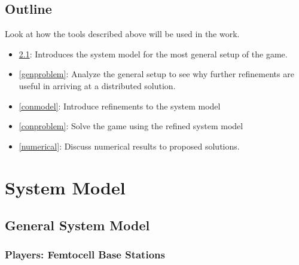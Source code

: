\documentclass[12pt,a4paper]{report}
\begin{document}
\section{Outline}
Look at how the tools described above will be used in the work. 
\begin{itemize}
\item 
\ref{genmodel}: Introduces the system model for the most general setup of the game.
\item 
\ref{genproblem}: Analyze the general setup to see why further refinements are useful in arriving at a distributed solution. 
\item
\ref{conmodel}: Introduce refinements to the system model 
\item 
\ref{conproblem}: Solve the game using the refined system model
\item 
\ref{numerical}: Discuss numerical results to proposed solutions. 
\end{itemize}
\chapter{System Model}

\section{General System Model}\label{genmodel}

\subsection{Players: Femtocell Base Stations}
\end{document}
